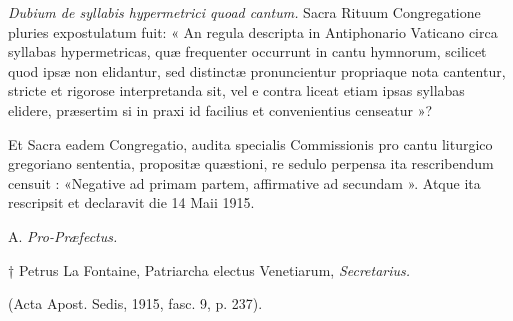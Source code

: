 \documentclass[vesperale_romanum.tex]{subfiles}
\begin{document}
\textit{Dubium de syllabis hypermetrici quoad cantum.} Sacra Rituum Congregatione pluries expostulatum fuit: « An regula descripta in Antiphonario Vaticano circa syllabas hypermetricas, quæ frequenter occurrunt in cantu hymnorum, scilicet quod ipsæ non elidantur, sed distin\-ctæ pronuncientur propriaque nota cantentur, stri\-cte et rigorose interpretanda sit, vel e contra liceat etiam i\-psas syllabas elidere, præsertim si in praxi id facilius et convenientius censeatur »?

Et Sacra eadem Congregatio, audita specialis Commissionis pro cantu liturgico gregoriano sententia, propositæ quæstioni, re sedulo perpensa ita rescribendum censuit : «Negative ad primam partem, affirmative ad secundam ». Atque ita rescripsit et declaravit die 14 Maii 1915.

\hfill{A.   \textit{Pro-Præfe\-ctus.}}

{\hfill† Petrus La Fontaine, Patriarcha ele\-ctus Venetiarum, \textit{Secretarius.}}

(Acta Apost. Sedis, 1915, fasc. 9, p. 237).

\newpage

\raggedbottom

\setlength{\defaultparskip}{\parskip}
\setlength{\parskip}{0.5\baselineskip plus 2pt}

\begingroup
\setlength{\parindent}{0pt}

{\par} \thispagestyle{empty}  \nopagebreak \par \nopagebreak\vspace{5mm}\label{kalendarium} %
\setlength\LTleft{0pt}
\setlength\LTright{0pt}
\setlength{\tabcolsep}{5pt}
\renewcommand{\arraystretch}{1.4}
\fontsize{8}{9}\selectfont


%






















\endgroup

\setlength{\parskip}{\defaultparskip}
\normalsize

\flushbottom

\mainmatter

\end{document}
